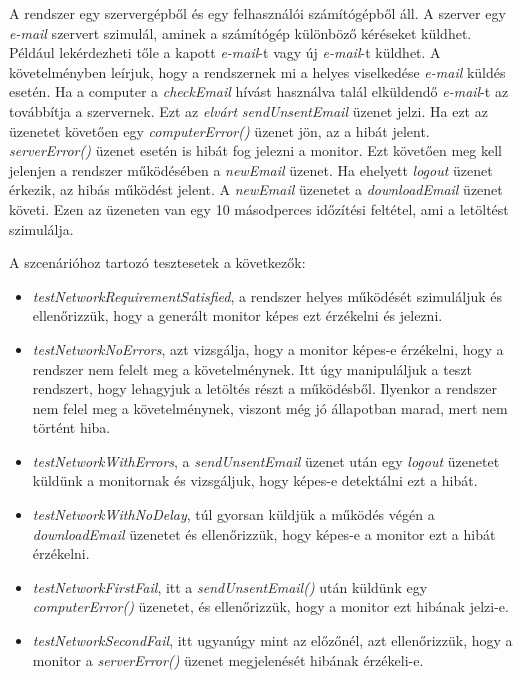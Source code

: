 A rendszer egy szervergépből és egy felhasználói számítógépből áll.
A szerver egy \textit{e-mail} szervert szimulál, aminek a számítógép különböző kéréseket küldhet.
Például lekérdezheti tőle a kapott \textit{e-mail}-t vagy új \textit{e-mail}-t küldhet.
A követelményben leírjuk, hogy a rendszernek mi a helyes viselkedése \textit{e-mail} küldés esetén.
Ha a computer a \textit{checkEmail} hívást használva talál elküldendő \textit{e-mail}-t az továbbítja a szervernek.
Ezt az \textit{elvárt} \textit{sendUnsentEmail} üzenet jelzi.
Ha ezt az üzenetet követően egy \textit{computerError()} üzenet jön, az a hibát jelent.
\textit{serverError()} üzenet esetén is hibát fog jelezni a monitor.
Ezt követően meg kell jelenjen a rendszer működésében a \textit{newEmail} üzenet.
Ha ehelyett \textit{logout} üzenet érkezik, az hibás működést jelent.
A \textit{newEmail} üzenetet a \textit{downloadEmail} üzenet követi.
Ezen az üzeneten van egy 10 másodperces időzítési feltétel, ami a letöltést szimulálja.

A szcenárióhoz tartozó tesztesetek a következők:
\begin{itemize}
    \item \textit{testNetworkRequirementSatisfied}, a rendszer helyes működését szimuláljuk és ellenőrizzük, hogy a generált monitor képes ezt érzékelni és jelezni.
    \item \textit{testNetworkNoErrors}, azt vizsgálja, hogy a monitor képes-e érzékelni, hogy a rendszer nem felelt meg a követelménynek.
    Itt úgy manipuláljuk a teszt rendszert, hogy lehagyjuk a letöltés részt a működésből.
    Ilyenkor a rendszer nem felel meg a követelménynek, viszont még jó állapotban marad, mert nem történt hiba.
    \item \textit{testNetworkWithErrors}, a \textit{sendUnsentEmail} üzenet után egy \textit{logout} üzenetet küldünk a monitornak és vizsgáljuk, hogy képes-e detektálni ezt a hibát.
    \item \textit{testNetworkWithNoDelay}, túl gyorsan küldjük a működés végén a \textit{downloadEmail} üzenetet és ellenőrizzük, hogy képes-e a monitor ezt a hibát érzékelni.
    \item \textit{testNetworkFirstFail}, itt a \textit{sendUnsentEmail()} után küldünk egy \textit{computerError()} üzenetet, és ellenőrizzük, hogy a monitor ezt hibának jelzi-e.
    \item \textit{testNetworkSecondFail}, itt ugyanúgy mint az előzőnél, azt ellenőrizzük, hogy a monitor a \textit{serverError()} üzenet megjelenését hibának érzékeli-e.
\end{itemize}

